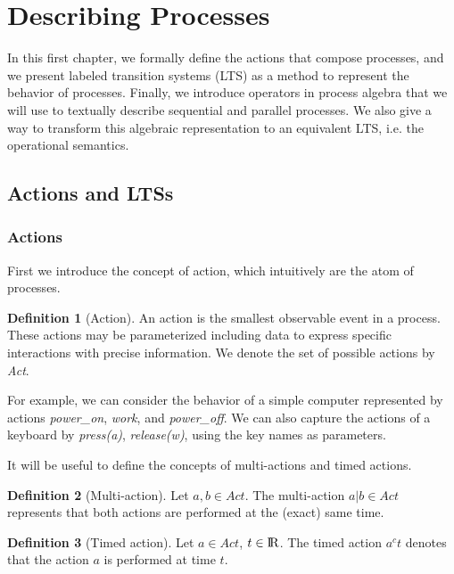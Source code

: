 \documentclass[11pt]{article}
\theoremstyle{definition}
\newtheorem{definition}{Definition}
\theoremstyle{plain}
\theoremstyle{definition}
\newcommand{\Act}{\textit{Act}}
\begin{document}
\section{Describing Processes}
In this first chapter, we formally define the actions that compose processes, and we present labeled transition systems (LTS) as a method to represent the behavior of processes. Finally, we introduce operators in process algebra that we will use to textually describe sequential and parallel processes. We also give a way to transform this algebraic representation to an equivalent LTS, i.e. the operational semantics.
\subsection{Actions and LTSs}
\subsubsection{Actions}
First we introduce the concept of action, which intuitively are the atom of processes.
\begin{definition} [Action]
	An action is the smallest observable event in a process. These actions may be parameterized including data to express specific interactions with precise information. We denote the set of possible actions by \Act.
\end{definition}

For example, we can consider the behavior of a simple computer represented by actions \textit{power\_on}, \textit{work}, and \textit{power\_off}. We can also capture the actions of a keyboard by \textit{press(a)}, \textit{release(w)}, using the key names as parameters.

It will be useful to define the concepts of multi-actions and timed actions.
\begin{definition}[Multi-action]
	Let $ a, b\in \Act $. The multi-action $ a|b \in \Act $ represents that both actions are performed at the (exact) same time.
\end{definition}
\begin{definition} [Timed action]
	Let $ a \in \Act $, $ t \in {\rm I\!R} $. The timed action $ a^c t $ denotes that the action $ a $ is performed at time $ t $.
\end{definition}
\end{document}
